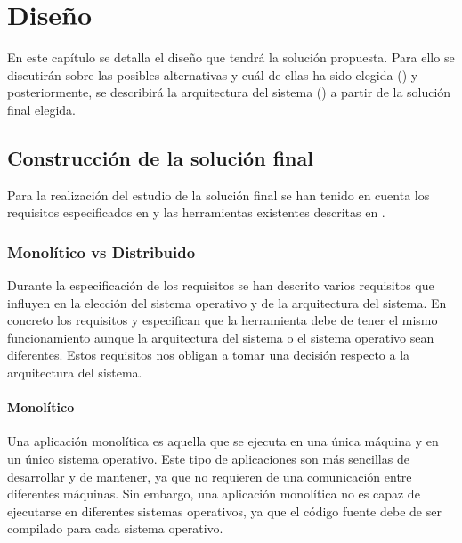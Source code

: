 \chapter{Diseño}\label{chap:diseno}
En este capítulo se detalla el diseño que tendrá la solución propuesta. Para ello se discutirán sobre las posibles alternativas y cuál de ellas ha sido elegida () y posteriormente, se describirá la arquitectura del sistema () a partir de la solución final elegida.

\section{Construcción de la solución final}\label{sec:estudio-solucion-final}

Para la realización del estudio de la solución final se han tenido en cuenta los requisitos especificados en  y las herramientas existentes descritas en . 

\subsection{Monolítico vs Distribuido} \label{subsec:monolitico-vs-distribuido}

Durante la especificación de los requisitos se han descrito varios requisitos que influyen en la elección del sistema operativo y de la arquitectura del sistema. En concreto los requisitos  y  especifican que la herramienta debe de tener el mismo funcionamiento aunque la arquitectura del sistema o el sistema operativo sean diferentes. Estos requisitos nos obligan a tomar una decisión respecto a la arquitectura del sistema. 

\subsubsection{Monolítico} \label{subsubsec:monolitico}

Una \gls{aplicación monolítica} \cite{DistributedSystems} es aquella que se ejecuta en una única máquina y en un único sistema operativo. Este tipo de aplicaciones son más sencillas de desarrollar y de mantener, ya que no requieren de una comunicación entre diferentes máquinas. Sin embargo, una \gls{aplicación monolítica} no es capaz de ejecutarse en diferentes sistemas operativos, ya que el \gls{código fuente} debe de ser compilado para cada sistema operativo. 


